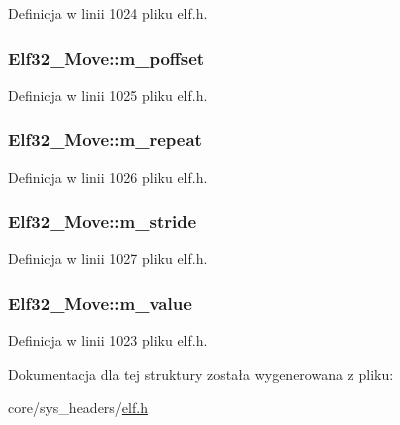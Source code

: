 Definicja w linii 1024 pliku elf.\-h.

\hypertarget{struct_elf32___move_a4b1119df05b7672effd0afb09b258f85}{
\subsubsection[{m\-\_\-poffset}]{ Elf32\-\_\-\-Move\-::m\-\_\-poffset}}\label{struct_elf32___move_a4b1119df05b7672effd0afb09b258f85}


Definicja w linii 1025 pliku elf.\-h.

\hypertarget{struct_elf32___move_a84620f9a22f6a4b0f8a8a6c4e332f600}{
\subsubsection[{m\-\_\-repeat}]{ Elf32\-\_\-\-Move\-::m\-\_\-repeat}}\label{struct_elf32___move_a84620f9a22f6a4b0f8a8a6c4e332f600}


Definicja w linii 1026 pliku elf.\-h.

\hypertarget{struct_elf32___move_a85ca12bb9ac30146a8533fccfe601b43}{
\subsubsection[{m\-\_\-stride}]{ Elf32\-\_\-\-Move\-::m\-\_\-stride}}\label{struct_elf32___move_a85ca12bb9ac30146a8533fccfe601b43}


Definicja w linii 1027 pliku elf.\-h.

\hypertarget{struct_elf32___move_ab9db1554472a8b54101e38298aabde19}{
\subsubsection[{m\-\_\-value}]{ Elf32\-\_\-\-Move\-::m\-\_\-value}}\label{struct_elf32___move_ab9db1554472a8b54101e38298aabde19}


Definicja w linii 1023 pliku elf.\-h.



Dokumentacja dla tej struktury została wygenerowana z pliku\-:\begin{DoxyCompactItemize}
\item 
core/sys\-\_\-headers/\hyperlink{elf_8h}{elf.\-h}\end{DoxyCompactItemize}
